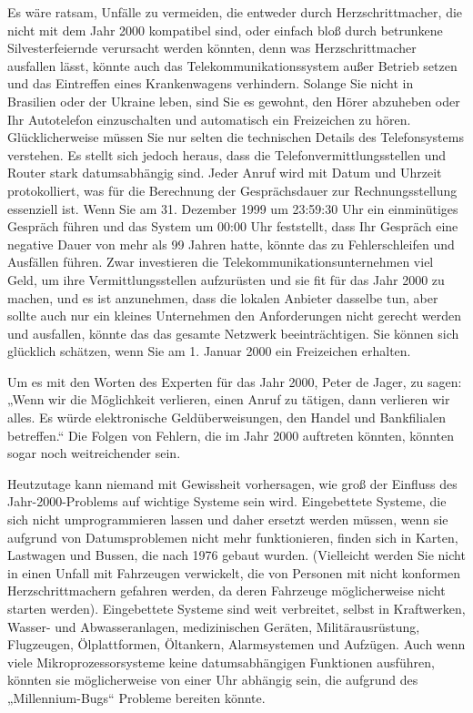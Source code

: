 \documentclass[
  a5paper,
  smalldemyvopaper,10pt,twoside,onecolumn,openright,extrafontsizes,hidelinks]{memoir}
\begin{document}
Es wäre ratsam, Unfälle zu vermeiden, die entweder durch
Herzschrittmacher, die nicht mit dem Jahr 2000 kompatibel sind, oder
einfach bloß durch betrunkene Silvesterfeiernde verursacht werden
könnten, denn was Herzschrittmacher ausfallen lässt, könnte auch das
Telekommunikationssystem außer Betrieb setzen und das Eintreffen eines
Krankenwagens verhindern. Solange Sie nicht in Brasilien oder der
Ukraine leben, sind Sie es gewohnt, den Hörer abzuheben oder Ihr
Autotelefon einzuschalten und automatisch ein Freizeichen zu hören.
Glücklicherweise müssen Sie nur selten die technischen Details des
Telefonsystems verstehen. Es stellt sich jedoch heraus, dass die
Telefonvermittlungsstellen und Router stark datumsabhängig sind. Jeder
Anruf wird mit Datum und Uhrzeit protokolliert, was für die Berechnung
der Gesprächsdauer zur Rechnungsstellung essenziell ist. Wenn Sie am 31.
Dezember 1999 um 23:59:30 Uhr ein einminütiges Gespräch führen und das
System um 00:00 Uhr feststellt, dass Ihr Gespräch eine negative Dauer
von mehr als 99 Jahren hatte, könnte das zu Fehlerschleifen und
Ausfällen führen. Zwar investieren die Telekommunikationsunternehmen
viel Geld, um ihre Vermittlungsstellen aufzurüsten und sie fit für das
Jahr 2000 zu machen, und es ist anzunehmen, dass die lokalen Anbieter
dasselbe tun, aber sollte auch nur ein kleines Unternehmen den
Anforderungen nicht gerecht werden und ausfallen, könnte das das gesamte
Netzwerk beeinträchtigen. Sie können sich glücklich schätzen, wenn Sie
am 1. Januar 2000 ein Freizeichen erhalten.

Um es mit den Worten des Experten für das Jahr 2000, Peter de Jager, zu
sagen: „Wenn wir die Möglichkeit verlieren, einen Anruf zu tätigen, dann
verlieren wir alles. Es würde elektronische Geldüberweisungen, den
Handel und Bankfilialen betreffen.`` Die Folgen von Fehlern, die im Jahr
2000 auftreten könnten, könnten sogar noch weitreichender sein.

Heutzutage kann niemand mit Gewissheit vorhersagen, wie groß der
Einfluss des Jahr-2000-Problems auf wichtige Systeme sein wird.
Eingebettete Systeme, die sich nicht umprogrammieren lassen und daher
ersetzt werden müssen, wenn sie aufgrund von Datumsproblemen nicht mehr
funktionieren, finden sich in Karten, Lastwagen und Bussen, die nach
1976 gebaut wurden. (Vielleicht werden Sie nicht in einen Unfall mit
Fahrzeugen verwickelt, die von Personen mit nicht konformen
Herzschrittmachern gefahren werden, da deren Fahrzeuge möglicherweise
nicht starten werden). Eingebettete Systeme sind weit verbreitet, selbst
in Kraftwerken, Wasser- und Abwasseranlagen, medizinischen Geräten,
Militärausrüstung, Flugzeugen, Ölplattformen, Öltankern, Alarmsystemen
und Aufzügen. Auch wenn viele Mikroprozessorsysteme keine
datumsabhängigen Funktionen ausführen, könnten sie möglicherweise von
einer Uhr abhängig sein, die aufgrund des „Millennium-Bugs`` Probleme
bereiten könnte.
\end{document}
